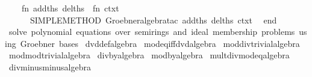 \begin{isabellebody}
\ \ \ \ {\isacharparenleft}{\kern0pt}fn\ {\isacharparenleft}{\kern0pt}add{\isacharunderscore}{\kern0pt}ths{\isacharcomma}{\kern0pt}\ del{\isacharunderscore}{\kern0pt}ths{\isacharparenright}{\kern0pt}\ {\isacharequal}{\kern0pt}{\isachargreater}{\kern0pt}\ fn\ ctxt\ {\isacharequal}{\kern0pt}{\isachargreater}{\kern0pt}\isanewline
\ \ \ \ \ \ SIMPLE{\isacharunderscore}{\kern0pt}METHOD{\isacharprime}{\kern0pt}\ {\isacharparenleft}{\kern0pt}Groebner{\isachardot}{\kern0pt}algebra{\isacharunderscore}{\kern0pt}tac\ add{\isacharunderscore}{\kern0pt}ths\ del{\isacharunderscore}{\kern0pt}ths\ ctxt{\isacharparenright}{\kern0pt}{\isacharparenright}{\kern0pt}\isanewline
\ \ end\isanewline
{\isacartoucheclose}\ {\isachardoublequoteopen}solve\ polynomial\ equations\ over\ {\isacharparenleft}{\kern0pt}semi{\isacharparenright}{\kern0pt}rings\ and\ ideal\ membership\ problems\ using\ Groebner\ bases{\isachardoublequoteclose}%
\endisatagML
{\isafoldML}%
%
\isadelimML
\isanewline
%
\endisadelimML
\isanewline
{}\isamarkupfalse%
\ dvd{\isacharunderscore}{\kern0pt}def{\isacharbrackleft}{\kern0pt}algebra{\isacharbrackright}{\kern0pt}\isanewline
{}\isamarkupfalse%
\ mod{\isacharunderscore}{\kern0pt}eq{\isacharunderscore}{\kern0pt}{}{\isacharunderscore}{\kern0pt}iff{\isacharunderscore}{\kern0pt}dvd{\isacharbrackleft}{\kern0pt}algebra{\isacharbrackright}{\kern0pt}\isanewline
{}\isamarkupfalse%
\ mod{\isacharunderscore}{\kern0pt}div{\isacharunderscore}{\kern0pt}trivial{\isacharbrackleft}{\kern0pt}algebra{\isacharbrackright}{\kern0pt}\isanewline
{}\isamarkupfalse%
\ mod{\isacharunderscore}{\kern0pt}mod{\isacharunderscore}{\kern0pt}trivial{\isacharbrackleft}{\kern0pt}algebra{\isacharbrackright}{\kern0pt}\isanewline
{}\isamarkupfalse%
\ div{\isacharunderscore}{\kern0pt}by{\isacharunderscore}{\kern0pt}{}{\isacharbrackleft}{\kern0pt}algebra{\isacharbrackright}{\kern0pt}\isanewline
{}\isamarkupfalse%
\ mod{\isacharunderscore}{\kern0pt}by{\isacharunderscore}{\kern0pt}{}{\isacharbrackleft}{\kern0pt}algebra{\isacharbrackright}{\kern0pt}\isanewline
{}\isamarkupfalse%
\ mult{\isacharunderscore}{\kern0pt}div{\isacharunderscore}{\kern0pt}mod{\isacharunderscore}{\kern0pt}eq{\isacharbrackleft}{\kern0pt}algebra{\isacharbrackright}{\kern0pt}\isanewline
{}\isamarkupfalse%
\ div{\isacharunderscore}{\kern0pt}minus{\isacharunderscore}{\kern0pt}minus{\isacharbrackleft}{\kern0pt}algebra{\isacharbrackright}{\kern0pt}\isanewline
{}\isamarkupfalse%

\end{isabellebody}

